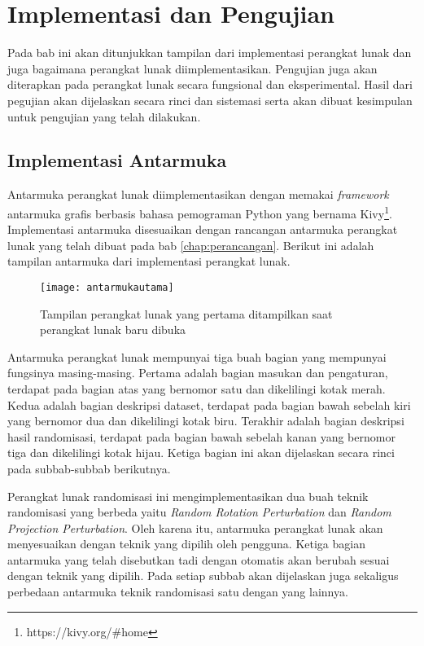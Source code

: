 \chapter{Implementasi dan Pengujian}
\label{chap:Implementasi}

Pada bab ini akan ditunjukkan tampilan dari implementasi perangkat lunak dan juga bagaimana perangkat lunak diimplementasikan. Pengujian juga akan diterapkan pada perangkat lunak secara fungsional dan eksperimental. Hasil dari pegujian akan dijelaskan secara rinci dan sistemasi serta akan dibuat kesimpulan untuk pengujian yang telah dilakukan.

\section{Implementasi Antarmuka}
\label{sec:implementasi-antarmuka}

Antarmuka perangkat lunak diimplementasikan dengan memakai \textit{framework} antarmuka grafis berbasis bahasa pemograman Python yang bernama Kivy\footnote{https://kivy.org/\#home}. Implementasi antarmuka disesuaikan dengan rancangan antarmuka perangkat lunak yang telah dibuat pada bab \ref{chap:perancangan}. Berikut ini adalah tampilan antarmuka dari implementasi perangkat lunak.

\begin{figure}
	\centering
	\texttt{[image: antarmukautama]}
	\caption{Tampilan perangkat lunak yang pertama ditampilkan saat perangkat lunak baru dibuka}
	\label{fig:antarmukautama}
\end{figure}

Antarmuka perangkat lunak mempunyai tiga buah bagian yang mempunyai fungsinya masing-masing. Pertama adalah bagian masukan dan pengaturan, terdapat pada bagian atas yang bernomor satu dan dikelilingi kotak merah. Kedua adalah bagian deskripsi dataset, terdapat pada bagian bawah sebelah kiri yang bernomor dua dan dikelilingi kotak biru. Terakhir adalah bagian deskripsi hasil randomisasi, terdapat pada bagian bawah sebelah kanan yang bernomor tiga dan dikelilingi kotak hijau. Ketiga bagian ini akan dijelaskan secara rinci pada subbab-subbab berikutnya.

Perangkat lunak randomisasi ini mengimplementasikan dua buah teknik randomisasi yang berbeda yaitu \textit{Random Rotation Perturbation} dan \textit{Random Projection Perturbation}. Oleh karena itu, antarmuka perangkat lunak akan menyesuaikan dengan teknik yang dipilih oleh pengguna. Ketiga bagian antarmuka yang telah disebutkan tadi dengan otomatis akan berubah sesuai dengan teknik yang dipilih. Pada setiap subbab akan dijelaskan juga sekaligus perbedaan antarmuka teknik randomisasi satu dengan yang lainnya.


